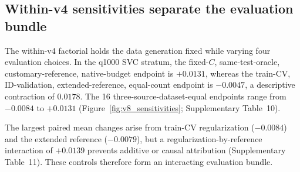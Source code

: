 \documentclass[referee,lineno,pdflatex,sn-nature]{sn-jnl}
\theoremstyle{thmstyleone}%
\theoremstyle{thmstyletwo}%
\theoremstyle{thmstylethree}%
\begin{document}
\begin{table}[t]
\centering
\caption{Logical circuit audit for the four quantum feature maps. Depth and CX columns give the values at 4 and 12 qubits after Qiskit 2.3.1 decomposition to \texttt{rz}, \texttt{sx}, \texttt{x}, and \texttt{cx}, optimization level 0, without device routing. ``Fidelity CX'' counts the compute--uncompute template for one kernel entry. Complete values at all five dimensions and one-qubit gate counts are provided in Supplementary Table~13 and the machine-readable artifact. These logical counts are not hardware-execution estimates.}
\label{tab:circuits}
\scriptsize
\setlength{\tabcolsep}{4pt}
\end{table}

\subsection{Within-v4 sensitivities separate the evaluation bundle}
\label{sec:res_v8_factorial}

The within-v4 factorial holds the data generation fixed while varying four evaluation choices. In the q1000 SVC stratum, the fixed-$C$, same-test-oracle, customary-reference, native-budget endpoint is $+0.0131$, whereas the train-CV, ID-validation, extended-reference, equal-count endpoint is $-0.0047$, a descriptive contraction of $0.0178$. The 16 three-source-dataset-equal endpoints range from $-0.0084$ to $+0.0131$ (Figure~\ref{fig:v8_sensitivities}; Supplementary Table~10).

The largest paired mean changes arise from train-CV regularization ($-0.0084$) and the extended reference ($-0.0079$), but a regularization-by-reference interaction of $+0.0139$ prevents additive or causal attribution (Supplementary Table~11). These controls therefore form an interacting evaluation bundle.
\end{document}
